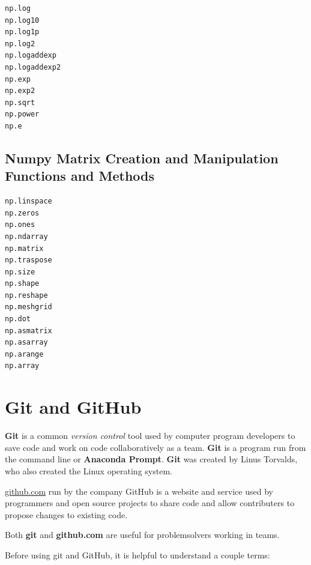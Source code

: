 \documentclass{book}
\begin{document}
    
        \begin{lstlisting}
np.log
np.log10
np.log1p
np.log2
np.logaddexp
np.logaddexp2
np.exp
np.exp2
np.sqrt
np.power
np.e
\end{lstlisting}
    




    
        \subsection{Numpy Matrix Creation and Manipulation Functions and
Methods}\label{numpy-matrix-creation-and-manipulation-functions-and-methods}
    




    
        \begin{lstlisting}
np.linspace
np.zeros
np.ones
np.ndarray
np.matrix
np.traspose
np.size
np.shape
np.reshape
np.meshgrid
np.dot
np.asmatrix
np.asarray
np.arange
np.array
\end{lstlisting}
    




    
        \section{Git and GitHub}\label{git-and-github}
    




    
        \textbf{Git} is a common \emph{version control} tool used by computer
program developers to save code and work on code collaboratively as a
team. \textbf{Git} is a program run from the command line or
\textbf{Anaconda Prompt}. \textbf{Git} was created by Linus Torvalds,
who also created the Linux operating system.
    




    
        \href{https://github.com/}{github.com} run by the company GitHub is a
website and service used by programmers and open source projects to
share code and allow contributers to propose changes to existing code.
    




    
        Both \textbf{git} and \textbf{github.com} are useful for problemsolvers
working in teams.
    




    
        Before using git and GitHub, it is helpful to understand a couple terms:
\end{document}
